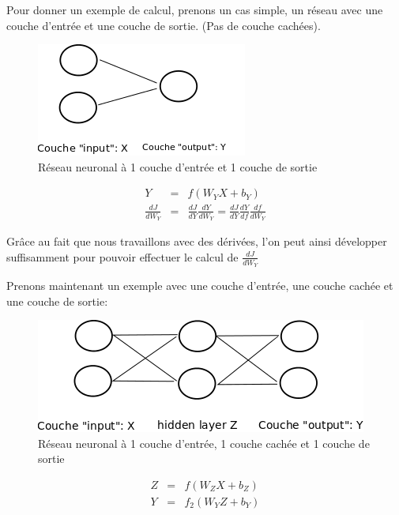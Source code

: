 \documentclass[11pt,a4paper]{report}
\begin{document}
    \par Pour donner un exemple de calcul, prenons un cas simple, un réseau avec une couche d'entrée et une couche de sortie. (Pas de couche cachées).
    
    \begin{figure}[!h]
    \center
    \includegraphics[scale=0.74]{ressources/nn_presentation_5.png}
    \caption{Réseau neuronal à 1 couche d'entrée et 1 couche de sortie}
    \end{figure} 
    
    \begin{eqnarray}
    Y &=& f(W_YX+b_Y) \\
    \frac{dJ}{dW_Y} &=& \frac{dJ}{dY} \frac{dY}{dW_Y} = \frac{dJ}{dY} \frac{dY}{df}\frac{df}{dW_Y}
    \end{eqnarray}
    
    \par Grâce au fait que nous travaillons avec des dérivées, l'on peut ainsi développer suffisamment pour pouvoir effectuer le calcul de $\frac{dJ}{dW_Y}$
    
    \newpage
    \par Prenons maintenant un exemple avec une couche d'entrée, une couche cachée et une couche de sortie: 
    
    \begin{figure}[!h]
    \center
    \includegraphics[scale=0.74]{ressources/nn_presentation_6.png}
    \caption{Réseau neuronal à 1 couche d'entrée, 1 couche cachée et 1 couche de sortie}
    \end{figure} 
    
    \begin{eqnarray}
    Z &=& f\left(W_ZX+b_Z\right) \\
    Y &=& f_2\left( W_YZ+b_Y \right) 
    \end{eqnarray}
    
\end{document}
